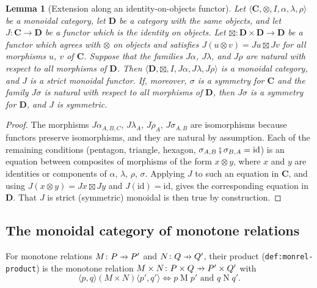 \documentclass[11pt,a4paper]{article}
\theoremstyle{plain}
\newtheorem{lemma}[theorem]{Lemma}
\theoremstyle{definition}
\theoremstyle{remark}
\newcommand{\Cat}[1]{\mathbf{#1}}
\newcommand{\then}{\mathbin{\fatsemi}}
\newcommand{\tup}[1]{\langle #1 \rangle}
\newcommand{\profto}{\mathrel{\ooalign{\hfil$\mapstochar\mkern 5mu$\hfil\cr$\to$\cr}}}
\newcommand{\rel}[3]{#1 \mathrel{#2} #3}
\newcommand{\id}{\mathrm{id}}
\newcommand{\lbl}[1]{\nolinkurl{#1}}
\begin{document}
\begin{lemma}[Extension along an identity-on-objects functor]
    \label{lem:extension}
    Let $\tup{\Cat{C}, \otimes, I, \alpha, \lambda, \rho}$ be a monoidal category, let $\Cat{D}$ be a category with the same objects, and let $J \colon \Cat{C} \to \Cat{D}$ be a functor which is the identity on objects.
    Let $\boxtimes \colon \Cat{D} \times \Cat{D} \to \Cat{D}$ be a functor which agrees with $\otimes$ on objects and satisfies $J(u \otimes v) = Ju \boxtimes Jv$ for all morphisms $u$, $v$ of $\Cat{C}$.
    Suppose that the families $J\alpha$, $J\lambda$, and $J\rho$ are natural with respect to all morphisms of $\Cat{D}$.
    Then $\tup{\Cat{D}, \boxtimes, I, J\alpha, J\lambda, J\rho}$ is a monoidal category, and $J$ is a strict monoidal functor.
    If, moreover, $\sigma$ is a symmetry for $\Cat{C}$ and the family $J\sigma$ is natural with respect to all morphisms of $\Cat{D}$, then $J\sigma$ is a symmetry for $\Cat{D}$, and $J$ is symmetric.
\end{lemma}
\begin{proof}
    The morphisms $J\alpha_{A,B,C}$, $J\lambda_A$, $J\rho_A$, $J\sigma_{A,B}$ are isomorphisms because functors preserve isomorphisms, and they are natural by assumption.
    Each of the remaining conditions (pentagon, triangle, hexagon, $\sigma_{A,B} \then \sigma_{B,A} = \id$) is an equation between composites of morphisms of the form $x \otimes y$, where $x$ and $y$ are identities or components of $\alpha$, $\lambda$, $\rho$, $\sigma$.
    Applying $J$ to such an equation in $\Cat{C}$, and using $J(x \otimes y) = Jx \boxtimes Jy$ and $J(\id) = \id$, gives the corresponding equation in $\Cat{D}$.
    That $J$ is strict (symmetric) monoidal is then true by construction.
\end{proof}

\subsection{The monoidal category of monotone relations}

For monotone relations $M \colon P \profto P'$ and $N \colon Q \profto Q'$, their product (\lbl{def:monrel-product}) is the monotone relation $M \times N \colon P \times Q \profto P' \times Q'$ with
\begin{equation}
    \label{eq:monrel-product}
    \rel{\tup{p,q}}{(M \times N)}{\tup{p',q'}}
    \iff
    \rel{p}{M}{p'} \text{ and } \rel{q}{N}{q'}.
\end{equation}
\end{document}

